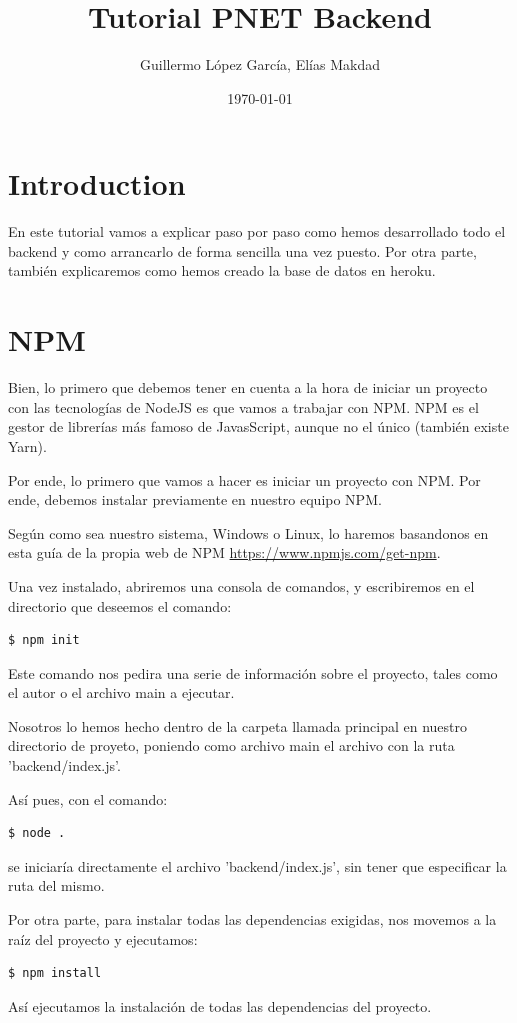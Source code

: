 \documentclass{article}
\title{Tutorial PNET Backend}
\author{Guillermo López García, Elías Makdad}
\date{\today}
\begin{document}
\maketitle

\tableofcontents

\section{Introduction}
En este tutorial vamos a explicar paso por paso como hemos desarrollado todo el backend y como arrancarlo de forma sencilla una vez puesto.
Por otra parte, también explicaremos como hemos creado la base de datos en heroku.

\section{NPM}
Bien, lo primero que debemos tener en cuenta a la hora de iniciar un proyecto con las tecnologías de NodeJS es que vamos a trabajar con NPM. NPM es el gestor de librerías más famoso de JavasScript, aunque no el único (también existe Yarn).

Por ende, lo primero que vamos a hacer es iniciar un proyecto con NPM. Por ende, debemos instalar previamente en nuestro equipo NPM.

Según como sea nuestro sistema, Windows o Linux, lo haremos basandonos en esta guía de la propia web de NPM \url{https://www.npmjs.com/get-npm}.

Una vez instalado, abriremos una consola de comandos, y escribiremos en el directorio que deseemos el comando:
\begin{lstlisting}[language=bash]
  $ npm init
\end{lstlisting}

Este comando nos pedira una serie de información sobre el proyecto, tales como el autor o el archivo main a ejecutar.

Nosotros lo hemos hecho dentro de la carpeta llamada principal en nuestro directorio de proyeto, poniendo como archivo main el archivo con la ruta 'backend/index.js'.

Así pues, con el comando:
\begin{lstlisting}[language=bash]
  $ node .
\end{lstlisting}
se iniciaría directamente el archivo 'backend/index.js', sin tener que especificar la ruta del mismo.

Por otra parte, para instalar todas las dependencias exigidas, nos movemos a la raíz del proyecto y ejecutamos: 
\begin{lstlisting}[language=bash]
  $ npm install
\end{lstlisting}
Así ejecutamos la instalación de todas las dependencias del proyecto.
\end{document}
